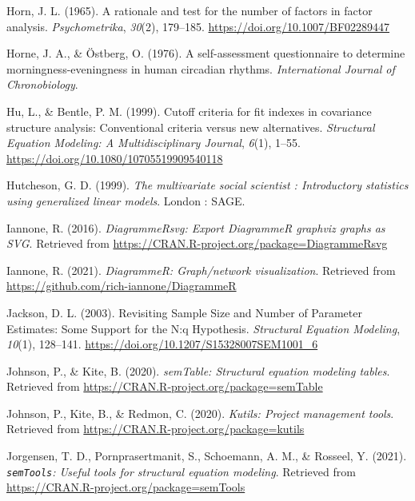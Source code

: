 \documentclass[
  english,
  man]{apa6}
\newlength{\cslhangindent}
\newlength{\cslentryspacingunit} %
\newenvironment{CSLReferences}[2] %
 {%
  \setlength{\parindent}{0pt}
  \ifodd #1
  \let\oldpar\par
  \def\par{\hangindent=\cslhangindent\oldpar}
  \fi
  \setlength{\parskip}{#2\cslentryspacingunit}
 }%
 {}
\begin{document}
\begin{CSLReferences}{1}{0}
\leavevmode{}%
Horn, J. L. (1965). A rationale and test for the number of factors in factor analysis. \emph{Psychometrika}, \emph{30}(2), 179--185. \url{https://doi.org/10.1007/BF02289447}

\leavevmode{}%
Horne, J. A., \& Östberg, O. (1976). A self-assessment questionnaire to determine morningness-eveningness in human circadian rhythms. \emph{International Journal of Chronobiology}.

\leavevmode{}%
Hu, L., \& Bentle, P. M. (1999). Cutoff criteria for fit indexes in covariance structure analysis: {Conventional} criteria versus new alternatives. \emph{Structural Equation Modeling: A Multidisciplinary Journal}, \emph{6}(1), 1--55. \url{https://doi.org/10.1080/10705519909540118}

\leavevmode{}%
Hutcheson, G. D. (1999). \emph{The multivariate social scientist : Introductory statistics using generalized linear models}. {London : SAGE}.

\leavevmode{}%
Iannone, R. (2016). \emph{DiagrammeRsvg: Export DiagrammeR graphviz graphs as SVG}. Retrieved from \url{https://CRAN.R-project.org/package=DiagrammeRsvg}

\leavevmode{}%
Iannone, R. (2021). \emph{DiagrammeR: Graph/network visualization}. Retrieved from \url{https://github.com/rich-iannone/DiagrammeR}

\leavevmode{}%
Jackson, D. L. (2003). Revisiting {Sample Size} and {Number} of {Parameter Estimates}: {Some Support} for the {N}:q {Hypothesis}. \emph{Structural Equation Modeling}, \emph{10}(1), 128--141. \url{https://doi.org/10.1207/S15328007SEM1001_6}

\leavevmode{}%
Johnson, P., \& Kite, B. (2020). \emph{semTable: Structural equation modeling tables}. Retrieved from \url{https://CRAN.R-project.org/package=semTable}

\leavevmode{}%
Johnson, P., Kite, B., \& Redmon, C. (2020). \emph{Kutils: Project management tools}. Retrieved from \url{https://CRAN.R-project.org/package=kutils}

\leavevmode{}%
Jorgensen, T. D., Pornprasertmanit, S., Schoemann, A. M., \& Rosseel, Y. (2021). \emph{\texttt{semTools}: {U}seful tools for structural equation modeling}. Retrieved from \url{https://CRAN.R-project.org/package=semTools}


\end{CSLReferences}
\end{document}
